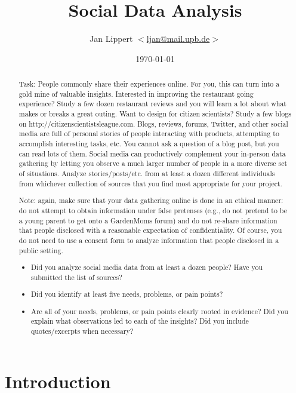 \documentclass[journal,10pt]{IEEEtran}
\title{Social Data Analysis}
\author{Jan Lippert \(<\)\href{mailt:ljan@mail.upb.de}{ljan@mail.upb.de}\(>\)}
\date{\today}
\begin{document}
\begin{abstract}
Task: People commonly share their experiences online.  For you, this can turn into a gold mine of valuable insights.  Interested in improving the restaurant going experience?  Study a few dozen restaurant reviews and you will learn a lot about what makes or breaks a great outing.  Want to design for citizen scientists?  Study a few blogs on http://citizenscientistsleague.com.  Blogs, reviews, forums, Twitter, and other social media are full of personal stories of people interacting with products, attempting to accomplish interesting tasks, etc.  You cannot ask a question of a blog post, but you can read lots of them.  Social media can productively complement your in-person data gathering by letting you observe a much larger number of people in a more diverse set of situations.   Analyze stories/posts/etc. from at least a dozen different individuals from whichever collection of sources that you find most appropriate for your project.

Note: again, make sure that your data gathering online is done in an ethical manner: do not attempt to obtain information under false pretenses (e.g., do not pretend to be a young parent to get onto a GardenMoms forum) and do not re-share information that people disclosed with a reasonable expectation of confidentiality.  Of course, you do not need to use a consent form to analyze information that people disclosed in a public setting.

\begin{itemize}
  \item Did you analyze social media data from at least a dozen people?  Have you submitted the list of sources?
  \item Did you identify at least five needs, problems, or pain points?
  \item Are all of your needs, problems, or pain points clearly rooted in evidence?  Did you explain what observations led to each of the insights? Did you include quotes/excerpts when necessary?
\end{itemize}
\end{abstract}

\maketitle

\section{Introduction}
\end{document}
